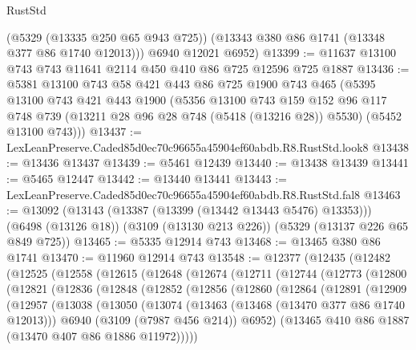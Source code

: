 \begin{lexlean}{RustStd}
\begin{coremodule}
        (@5329 (@13335 @250 @65 @943 @725))
        (@13343 @380 @86 @1741 (@13348 @377 @86 @1740 @12013)))
      @6940
      @12021
      @6952)
@13399 := @11637 @13100 @743 @743 @11641 @2114 @450 @410 @86 @725 @12596 @725 @1887
@13436 := @5381
    @13100
    @743
    @58
    @421
    @443
    @86
    @725
    @1900
    @743
    @465
    (@5395
      @13100
      @743
      @421
      @443
      @1900
      (@5356
        @13100
        @743
        @159
        @152
        @96
        @117
        @748
        @739
        (@13211 @28 @96 @28 @748 (@5418 (@13216 @28)) @5530)
        (@5452 @13100 @743)))
@13437 := LexLeanPreserve.Caded85d0ec70c96655a45904ef60abdb.R8.RustStd.look8
@13438 := @13436 @13437
@13439 := @5461 @12439
@13440 := @13438 @13439
@13441 := @5465 @12447
@13442 := @13440 @13441
@13443 := LexLeanPreserve.Caded85d0ec70c96655a45904ef60abdb.R8.RustStd.fal8
@13463 := @13092
    (@13143 (@13387 (@13399 (@13442 @13443 @5476) @13353)))
    (@6498 (@13126 @18))
    (@3109 (@13130 @213 @226))
    (@5329 (@13137 @226 @65 @849 @725))
@13465 := @5335 @12914 @743
@13468 := @13465 @380 @86 @1741
@13470 := @11960 @12914 @743
@13548 := @12377
    (@12435
      (@12482
        (@12525
          (@12558
            (@12615
              (@12648
                (@12674
                  (@12711
                    (@12744
                      (@12773
                        (@12800
                          (@12821
                            (@12836
                              (@12848
                                (@12852
                                  (@12856
                                    (@12860
                                      (@12864
                                        (@12891
                                          (@12909
                                            (@12957
                                              (@13038
                                                (@13050
                                                  (@13074
                                                    (@13463 (@13468 (@13470 @377 @86 @1740 @12013)))
                                                    @6940
                                                    (@3109 (@7987 @456 @214))
                                                    @6952)
                                                  (@13465
                                                    @410
                                                    @86
                                                    @1887
                                                    (@13470 @407 @86 @1886 @11972)))))

\end{coremodule}
\end{lexlean}
